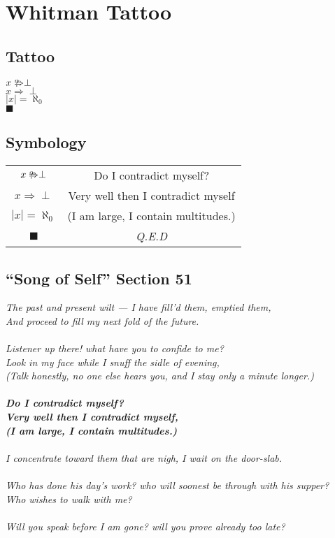 \documentclass[12pt]{article}
\newcommand\qimplies{%
  \mathrel{\ooalign{\hss$\Rightarrow$\hss\cr%
  \kern0.1ex\lower0.2ex\hbox{\scalebox{1}{$?$}}}}}
\begin{document}
\section{Whitman Tattoo}
\subsection{Tattoo}
\begin{center}{\huge
$ x \qimplies \perp $ \\
$ x \Rightarrow \perp $ \\
$  | x | = \aleph_0 $ \\
$  \blacksquare $ \\
}
\end{center}
\subsection{Symbology}
\begin{center}
\def\arraystretch{1.5}%
\begin{tabular}{ |c|c| } 
 \hline
 $ x \qimplies \perp $  & Do I contradict myself? \\ 
 $ x \Rightarrow \perp $ & Very well then I contradict myself \\ 
 $  | x | = \aleph_0 $ & (I am large, I contain multitudes.) \\ 
 $  \blacksquare $ & \textit{Q.E.D} \\ 
 \hline
\end{tabular}
\end{center}
\subsection{``Song of Self'' Section 51}
\textit{The past and present wilt --- I have fill'd them, emptied them,\\
And proceed to fill my next fold of the future.\\
\\
Listener up there! what have you to confide to me?\\
Look in my face while I snuff the sidle of evening,\\
(Talk honestly, no one else hears you, and I stay only a  minute longer.)\\
\\
\textbf{Do I contradict myself?\\
Very well then I contradict myself,\\
(I am large, I contain multitudes.)}\\
\\
I concentrate toward them that are nigh, I wait on the door-slab.\\
\\
Who has done his day's work? who will soonest be through with his supper?\\
Who wishes to walk with me?\\
\\
Will you speak before I am gone? will you prove already too  late?
}
\end{document}
